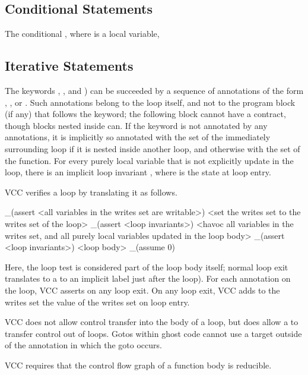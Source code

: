 \documentclass[preprint,nocopyrightspace]{sigplanconf}
\begin{document}
{{{\begin{VCC}
\subsection{Conditional Statements}
The conditional , where  is a local
variable,

\subsection{Iterative Statements}
The keywords , , and ) 
can be succeeded by a sequence of annotations of the form 
, , or 
. Such annotations belong to the loop itself, and
not to the program block (if any) that follows the keyword; the
following block cannot have a contract, though blocks nested inside
can. If the keyword is not annotated by any  annotations,
it is implicitly so annotated with the  set of the
immediately surrounding loop if it is nested inside another loop, and
otherwise with the  set of the function. For every
purely local variable  that is not explicitly update in the
loop, there is an implicit loop invariant ,
where  is the state at loop entry.

VCC verifies a loop by translating it as follows. 

\begin{VCC}
_(assert <all variables in the writes set are writable>)
<set the writes set to the writes set of the loop>
_(assert <loop invariants>)
<havoc all variables in the writes set, and all purely local variables
 updated in the loop body>
_(assert <loop invariants>)
<loop body>
_(assume 0)

\end{VCC}

Here, the loop test is considered part of the loop body itself; normal
loop exit translates to a  to an implicit label just after the
loop). For each annotation  on the loop, VCC asserts 
 on any loop exit. On any loop exit, VCC adds to the writes set
the value of the writes set on loop entry.

VCC does not allow control transfer into the body of a loop, but does
allow a  to transfer control out of loops.
Gotos within ghost code cannot use a target outside of
the  annotation in which the goto occurs.

VCC requires that the control flow graph of a function body is
reducible. 


\end{VCC}}}}
\end{document}

